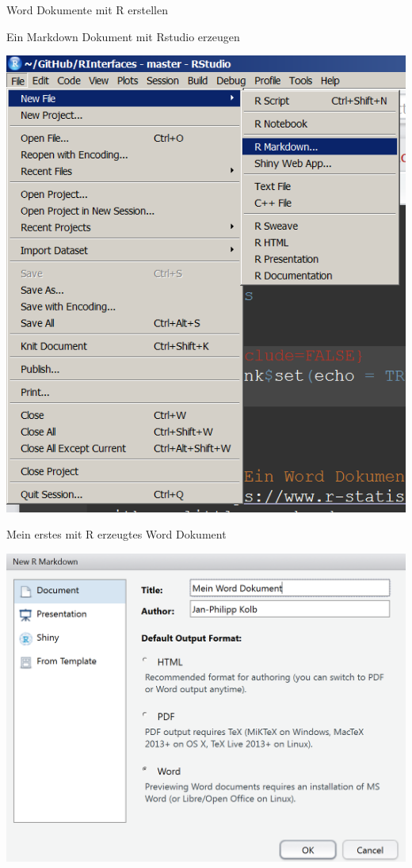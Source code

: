 \documentclass[ignorenonframetext,]{beamer}
\begin{document}
\begin{frame}[fragile]{Word Dokumente mit R erstellen}

\begin{block}{Ein Markdown Dokument mit Rstudio erzeugen}

\includegraphics{./tex2pdf.9796/5d3751200afa25066a5dc8f2f69512aee7f6bcff.png}

\end{block}

\begin{block}{Mein erstes mit R erzeugtes Word Dokument}

\includegraphics{./tex2pdf.9796/7a7960c7cb6511f9b21b065a6e95f68208ce6f5c.png}


\end{block}
\end{frame}
\end{document}
